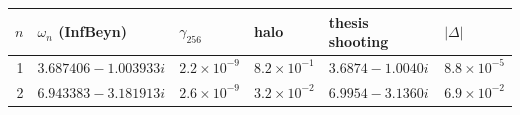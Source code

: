 \begin{tabular}{rlllll}
\toprule
$n$ & $\omega_n$ (InfBeyn) & $\gamma_{256}$ & halo & thesis shooting & $|\Delta|$\\
\midrule
1 & $3.687406-1.003933i$ & $2.2\times10^{-9}$ & $8.2\times10^{-1}$ & $3.6874-1.0040i$ & $8.8\times10^{-5}$\\
2 & $6.943383-3.181913i$ & $2.6\times10^{-9}$ & $3.2\times10^{-2}$ & $6.9954-3.1360i$ & $6.9\times10^{-2}$\\
\bottomrule
\end{tabular}
